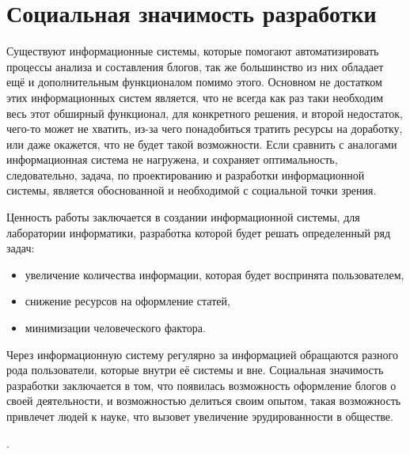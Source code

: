 \section{Социальная значимость разработки}
Существуют информационные системы, которые помогают автоматизировать процессы анализа и составления блогов, так же большинство из них обладает ещё и дополнительным функционалом помимо этого. Основном не достатком этих информационных систем является, что не всегда как раз таки необходим весь этот обширный функционал, для конкретного решения, и второй недостаток, чего-то может не хватить, из-за чего понадобиться тратить ресурсы на доработку, или даже окажется, что не будет такой возможности.
Если сравнить с аналогами информационная система не нагружена, и сохраняет оптимальность, следовательно, задача, по проектированию и разработки информационной системы, является обоснованной и необходимой с социальной точки зрения.

Ценность работы заключается в создании информационной системы, для лаборатории информатики, разработка которой будет решать определенный ряд задач:
\begin{itemize}
	\item увеличение количества информации, которая будет воспринята пользователем,
	\item снижение ресурсов на оформление статей,
	\item минимизации человеческого фактора.
\end{itemize}

Через информационную систему регулярно за информацией обращаются разного рода пользователи, которые внутри её системы и вне. Социальная значимость разработки заключается в том, что появилась возможность оформление блогов о своей деятельности, и возможностью делиться своим опытом, такая возможность привлечет людей к науке, что вызовет увеличение эрудированности в обществе. 

.  

\pagebreak